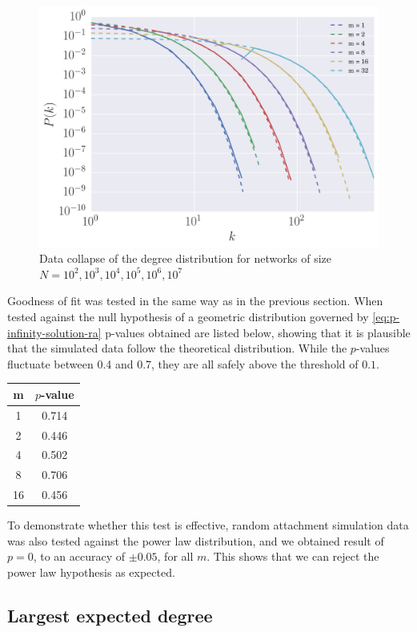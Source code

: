 \begin{figure}
    \centering
    \includegraphics[height=0.5\linewidth]{img/ra-fixed-n-logbin}
    \caption{Data collapse of the degree distribution for networks of size $N=10^2, 10^3, 10^4, 10^5, 10^6, 10^7$}
    \label{fig:ra-fixed-n-logbin}
\end{figure}

Goodness of fit was tested in the same way as in the previous section. When tested against the null hypothesis of a geometric distribution governed by \autoref{eq:p-infinity-solution-ra} p-values obtained are listed below, showing that it is plausible that the simulated data follow the theoretical distribution. While the $p$-values fluctuate between 0.4 and 0.7, they are all safely above the threshold of $0.1$. 

\begin{center}
\begin{tabular}{ c | c }
m & $p$-value \\
\hline
1  & 0.714 \\
2  & 0.446 \\
4  & 0.502 \\
8  & 0.706 \\
16 & 0.456 \\
\end{tabular}
\label{table:ra-ks-test}
\end{center}

To demonstrate whether this test is effective, random attachment simulation data was also tested against the power law distribution, and we obtained result of $p = 0$, to an accuracy of $\pm 0.05$, for all $m$. This shows that we can reject the power law hypothesis as expected. 

\subsection{Largest expected degree}\label{subsection:largest-expected-degree}
